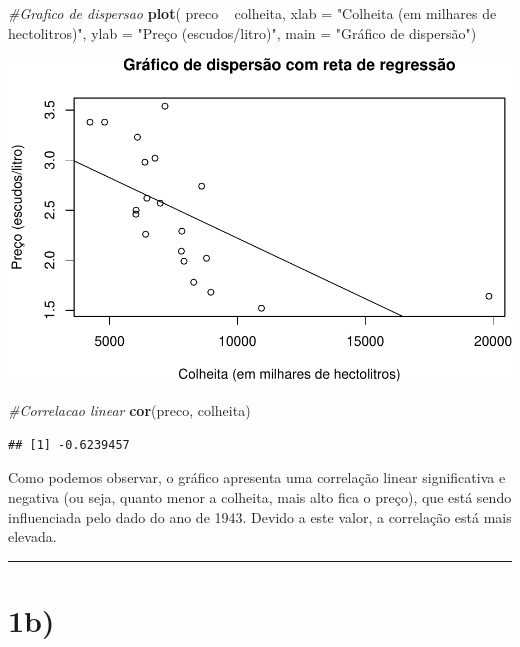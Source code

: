 \documentclass[11pt,]{article}
\makeatletter
\newenvironment{Shaded}{\begin{snugshade}}{\end{snugshade}}
\newcommand{\KeywordTok}[1]{\textcolor[rgb]{0.13,0.29,0.53}{\textbf{{#1}}}}
\newcommand{\DataTypeTok}[1]{\textcolor[rgb]{0.13,0.29,0.53}{{#1}}}
\newcommand{\StringTok}[1]{\textcolor[rgb]{0.31,0.60,0.02}{{#1}}}
\newcommand{\CommentTok}[1]{\textcolor[rgb]{0.56,0.35,0.01}{\textit{{#1}}}}
\newcommand{\NormalTok}[1]{{#1}}
\def\maxwidth{\ifdim\Gin@nat@width>\linewidth\linewidth
\else\Gin@nat@width\fi}
\let\Oldincludegraphics\includegraphics
\renewcommand{\includegraphics}[1]{\Oldincludegraphics[width=\maxwidth]{#1}}
\makeatother
\begin{document}
\begin{Shaded}
\begin{Highlighting}[]
\CommentTok{#Grafico de dispersao}
\KeywordTok{plot}\NormalTok{( preco ~}\StringTok{ }\NormalTok{colheita, }
      \DataTypeTok{xlab =} \StringTok{"Colheita (em milhares de hectolitros)"}\NormalTok{,}
      \DataTypeTok{ylab =} \StringTok{"Preço (escudos/litro)"}\NormalTok{,}
      \DataTypeTok{main =} \StringTok{"Gráfico de dispersão"}\NormalTok{)}
\end{Highlighting}
\end{Shaded}

\includegraphics{versaofinal_lista3_files/figure-latex/unnamed-chunk-3-1.pdf}

\begin{Shaded}
\begin{Highlighting}[]
\CommentTok{#Correlacao linear }
\KeywordTok{cor}\NormalTok{(preco, colheita)}
\end{Highlighting}
\end{Shaded}

\begin{verbatim}
## [1] -0.6239457
\end{verbatim}

Como podemos observar, o gráfico apresenta uma correlação linear
significativa e negativa (ou seja, quanto menor a colheita, mais alto
fica o preço), que está sendo influenciada pelo dado do ano de 1943.
Devido a este valor, a correlação está mais elevada.

\begin{center}\rule{0.5\linewidth}{\linethickness}\end{center}

\section{1b)}\label{b}
\end{document}
